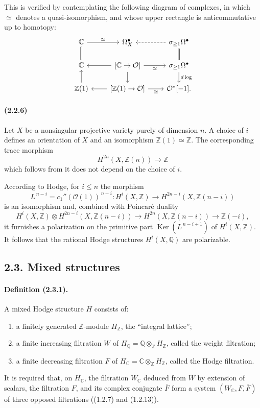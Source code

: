 \documentclass[10pt]{article}
\newcommand{\C}{\mathbb C}
\newcommand{\Q}{\mathbb Q}
\newcommand{\Z}{\mathbb Z}
\newcommand{\Ker}{\operatorname{Ker}}
\providecommand{\cO}{\mathcal O}
\providecommand{\cO}{\mathcal O}
\newcommand{\dlog}{d\log}
\begin{document}
This is verified by contemplating the following diagram of complexes, in which $\simeq$ denotes a quasi-isomorphism, and whose upper rectangle is anticommutative up to homotopy:
\[
\begin{tikzcd}[column sep=2.2em,row sep=1.5em]
\C \arrow[r,"\simeq"] \arrow[d,equal] & \Omega_X^\bullet & \sigma_{\ge1}\Omega^\bullet \arrow[l,dashed] \arrow[d,equal]\\
\C & {[\C\to\cO]} \arrow[l] \arrow[r,"\simeq"'] \arrow[d] & \sigma_{\ge1}\Omega^\bullet \arrow[u,equal] \arrow[d,"\dlog"]\\
\Z(1) \arrow[u] & {[\Z(1)\to\cO]} \arrow[l] \arrow[r,"\simeq"'] & \cO^*[-1].
\end{tikzcd}
\]

\paragraph{(2.2.6)} Let $X$ be a nonsingular projective variety purely of dimension $n$. A choice of $i$ defines an orientation of $X$ and an isomorphism $\Z(1)\simeq\Z$. The corresponding trace morphism
\[
H^{2n}(X,\Z(n))\longrightarrow\Z
\]
which follows from it does not depend on the choice of $i$.

According to Hodge, for $i\le n$ the morphism
\[
L^{\,n-i}=c_1''(\cO(1))^{\,n-i}:H^i(X,\Z)\longrightarrow H^{2n-i}(X,\Z(n-i))
\]
is an isomorphism and, combined with Poincaré duality
\[
H^i(X,\Z)\otimes H^{2n-i}(X,\Z(n-i))\longrightarrow
H^{2n}(X,\Z(n-i))\longrightarrow \Z(-i),
\]
it furnishes a polarization on the primitive part $\Ker(L^{\,n-i+1})$ of $H^i(X,\Z)$. It follows that the rational Hodge structures $H^i(X,\Q)$ are polarizable.

\subsection*{2.3. Mixed structures}

\paragraph{Definition (2.3.1).} A mixed Hodge structure $H$ consists of:
\begin{enumerate}[label=\alph*)]
\item a finitely generated $\Z$-module $H_\Z$, the ``integral lattice'';
\item a finite increasing filtration $W$ of $H_\Q=\Q\otimes_\Z H_\Z$, called the weight filtration;
\item a finite decreasing filtration $F$ of $H_\C=\C\otimes_\Z H_\Z$, called the Hodge filtration.
\end{enumerate}
It is required that, on $H_\C$, the filtration $W_\C$ deduced from $W$ by extension of scalars, the filtration $F$, and its complex conjugate $\overline F$ form a system $(W_\C,F,\overline F)$ of three opposed filtrations ((1.2.7) and (1.2.13)).
\end{document}
